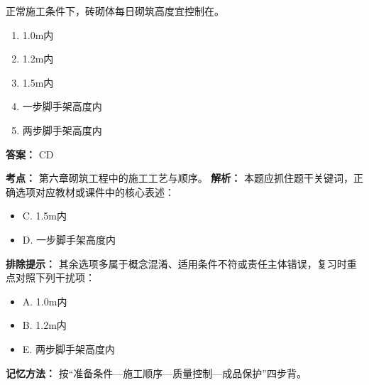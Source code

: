 \documentclass[UTF8,fontset=fandol,11pt]{ctexart}
\begin{document}
\begin{quizbox}[title={第 26 题}]
正常施工条件下，砖砌体每日砌筑高度宜控制在。\\
\begin{enumerate}[label=\Alph*.]
\item 1.0m内
\item 1.2m内
\item 1.5m内
\item 一步脚手架高度内
\item 两步脚手架高度内
\end{enumerate}
\textbf{答案：} CD
\vspace{0.25em}
\begin{answerbox}[title={考点解析}]
\textbf{考点：} 第六章砌筑工程中的施工工艺与顺序。
\textbf{解析：} 本题应抓住题干关键词，正确选项对应教材或课件中的核心表述：
\begin{itemize}
\item C. 1.5m内
\item D. 一步脚手架高度内
\end{itemize}
\textbf{排除提示：} 其余选项多属于概念混淆、适用条件不符或责任主体错误，复习时重点对照下列干扰项：
\begin{itemize}
\item A. 1.0m内
\item B. 1.2m内
\item E. 两步脚手架高度内
\end{itemize}
\textbf{记忆方法：} 按“准备条件—施工顺序—质量控制—成品保护”四步背。
\end{answerbox}
\end{quizbox}
\end{document}
